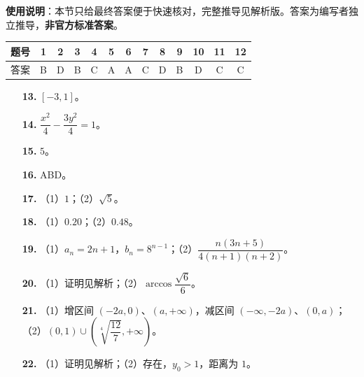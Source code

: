 
\begin{gknotice}
\textbf{使用说明}：本节只给最终答案便于快速核对，完整推导见解析版。答案为编写者独立推导，\textbf{非官方标准答案}。
\end{gknotice}

\begin{center}\begin{tabular}{ccccccccccccc}
\toprule
题号 & 1 & 2 & 3 & 4 & 5 & 6 & 7 & 8 & 9 & 10 & 11 & 12 \\
\midrule
答案 & B & D & B & C & A & A & C & D & B & D & C & C \\
\bottomrule
\end{tabular}\end{center}

\begin{itemize}[leftmargin=2.6em]
  \item[\textbf{13.}] $[-3,1]$。
  \item[\textbf{14.}] $\dfrac{x^2}4-\dfrac{3y^2}4=1$。
  \item[\textbf{15.}] $5$。
  \item[\textbf{16.}] ABD。
\end{itemize}

\begin{itemize}[leftmargin=2.6em]
  \item[\textbf{17.}] （1）$1$；（2）$\sqrt5$。
  \item[\textbf{18.}] （1）$0.20$；（2）$0.48$。
  \item[\textbf{19.}] （1）$a_n=2n+1$，$b_n=8^{n-1}$；（2）$\dfrac{n(3n+5)}{4(n+1)(n+2)}$。
  \item[\textbf{20.}] （1）证明见解析；（2）$\arccos\dfrac{\sqrt6}6$。
  \item[\textbf{21.}] （1）增区间 $(-2a,0)$、$(a,+\infty)$，减区间 $(-\infty,-2a)$、$(0,a)$；（2）$(0,1)\cup\left(\sqrt[4]{\dfrac{12}7},+\infty\right)$。
  \item[\textbf{22.}] （1）证明见解析；（2）存在，$y_0>1$，距离为 $1$。
\end{itemize}
